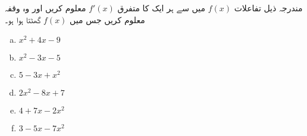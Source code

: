 مندرجہ ذیل تفاعلات  \(f(x)\) میں سے ہر ایک کا متفرق 		\( f\prime (x)\) معلوم کریں اور وہ وقفہ معلوم کریں جس میں \(f(x)\)  گھٹتا ہوا ہو۔		
\begin{multicols}{3}
\begin{enumerate}[a.]
\item \(  x^{2}+4x-9  \)
\item \(   x^{2}-3x-5 \hspace{50pt}  \)
\item  \( 5-3x+x^{2}     \)
\item  \(  2x^{2}-8x+7 \hspace{50pt}   \)
\item  \( 4+7x-2x^{2} \hspace{50pt}   \)
\item \(  3-5x-7x^{2}  \)
\end{enumerate}
\end{multicols}

